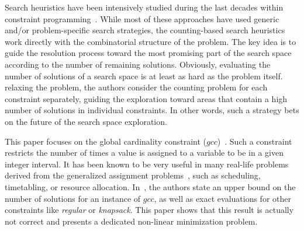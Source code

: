 Search heuristics have been intensively studied during the last decades within constraint programming~\cite{BoussemartHLS04,Refalo04,MichelH12}. While most of these approaches have used generic and/or problem-specific search strategies, the counting\--based search heuristics~\cite{PesantQZ12} work directly with the combinatorial structure of the problem. The key idea is to guide the resolution process toward the most promising part of the search space according to the number of remaining solutions. 
Obviously, evaluating the number of solutions of a search space is at least as hard as the problem itself.
 relaxing the problem, the authors consider the counting problem for each constraint separately, guiding the exploration toward areas that contain a high number of solutions in individual constraints. In other words, such a strategy bets on the future of the search space exploration.

This paper focuses on the global cardinality constraint ($gcc$)~\cite{Regin96}. 
Such a constraint restricts the number of times a value is assigned to a variable to be in a given integer interval. It has been known to be very useful in many real-life problems derived from the generalized assignment problems~\cite{Ford}, such as scheduling, timetabling, or resource allocation. 
In~\cite{PesantQZ12}, the authors state an upper bound on the number of solutions for an instance of $gcc$, as well as exact evaluations for other constraints like \emph{regular} or \emph{knapsack}. This paper shows that this result is actually not correct and presents  a dedicated non\--linear minimization problem.  

